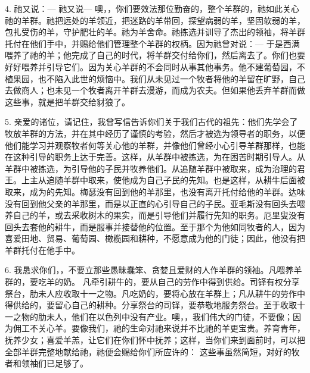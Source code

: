 4.  祂又说：—  祂又说—  噢，，你们要效法那位勤奋的，整个羊群的，祂如此关心祂的羊群。祂把远处的羊领近，把迷路的羊带回，探望病弱的羊，坚固软弱的羊，包扎受伤的羊，守护肥壮的羊。祂为羊舍命。祂拣选并训导了杰出的领袖，将羊群托付在他们手中，并赐给他们管理整个羊群的权柄。因为祂曾对说：—  于是西满喂养了祂的羊；他完成了自己的时代，将羊群交付给你们，然后离去了。你们也要好好喂养并引导它们。因为关心羊群的不会同时从事其他事务。他不建葡萄园，不植果园，也不陷入此世的烦恼中。我们从未见过一个牧者将他的羊留在旷野，自己去做商人；也未见一个牧者离开羊群去漫游，而成为农夫。但如果他丢弃羊群而做这些事，就是把羊群交给豺狼了。\par

5. 亲爱的诸位，请记住，我曾写信告诉你们关于我们古代的祖先：他们先学会了牧放羊群的方法，并在其中经历了谨慎的考验，然后才被选为领导者的职务，以便他们能学习并观察牧者何等关心他的羊群，并像他们曾经小心引导羊群那样，也能在这种引导的职务上达于完善。这样，从羊群中被拣选，为在困苦时期引导人。从羊群中被拣选，为引导他的子民并牧养他们。从追随羊群中被取来，成为治理的君王。上主从追随羊群中取来，使他成为自己子民的先知。也是这样，从耕牛后面被取来，成为的先知。梅瑟没有回到他的羊那里，也没有离开托付给他的羊群。达味没有回到他父亲的羊那里，而是以正直的心引导自己的子民。亚毛斯没有回头去喂养自己的羊，或去采收树木的果实，而是引导他们并履行先知的职务。厄里叟没有回头去套他的耕牛，而是服事并接替他的位置。至于那个为他如同牧者的人，因为喜爱田地、贸易、葡萄园、橄榄园和耕种，不愿意成为他的门徒；因此，他没有把羊群托付在他手中。\par

6. 我恳求你们，，不要立那些愚昧蠢笨、贪婪且爱财的人作羊群的领袖。凡喂养羊群的，要吃羊的奶。 凡牵引耕牛的，要从自己的劳作中得到供给。司铎有权分享祭台，肋未人应收取十一之物。凡吃奶的，要将心放在羊群上；凡从耕牛的劳作中得供给的，要留心自己的耕种。分享祭台的司铎，要恭敬地服务祭台。至于收取十一之物的肋未人，他们在以色列中没有产业。噢，，我们伟大的门徒，不要像；因为佣工不关心羊。要像我们，祂的生命对祂来说并不比祂的羊更宝贵。养育青年，抚养少女；喜爱羊羔，让它们在你们怀中抚养；这样，当你们来到面前时，可以把全部羊群完整地献给祂，祂便会赐给你们所应许的： 这些事虽然简短，对好的牧者和领袖们已足够了。\par

